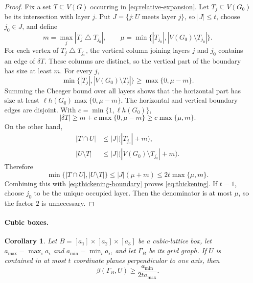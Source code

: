 \documentclass[aps,prx,reprint,superscriptaddress,nofootinbib,floatfix,longbibliography]{revtex4-2}
\newtheorem{corollary}[theorem]{Corollary}
\theoremstyle{definition}
\begin{document}
\begin{proof}
Fix a set $T\subseteq V(G)$ occurring in
\eqref{eq:relative-expansion}.  Let $T_j\subseteq V(G_0)$ be its
intersection with layer $j$.  Put
$J=\{j:U\text{ meets layer }j\}$, so $|J|\leq t$, choose $j_0\in J$, and
define
\begin{equation}
 m=\max_j|T_j\mathbin\triangle T_{j_0}|,
 \qquad
 \mu=\min\{|T_{j_0}|,|V(G_0)\setminus T_{j_0}|\}.
\end{equation}
For each vertex of $T_j\mathbin\triangle T_{j_0}$, the vertical column
joining layers $j$ and $j_0$ contains an edge of $\delta T$.  These columns
are distinct, so the vertical part of the boundary has size at least $m$.
For every $j$,
\begin{equation}
 \min\{|T_j|,|V(G_0)\setminus T_j|\}
 \geq \max\{0,\mu-m\}.
\end{equation}
Summing the Cheeger bound over all layers shows that the horizontal part
has size at least
$\ell h(G_0)\max\{0,\mu-m\}$.  The horizontal and vertical boundary edges
are disjoint.  With $c=\min\{1,\ell h(G_0)\}$,
\begin{equation}
 |\delta T|
 \geq m+c\max\{0,\mu-m\}
 \geq c\max\{\mu,m\}.
 \label{eq:thickening-boundary}
\end{equation}
On the other hand,
\begin{align}
 |T\cap U|&\leq |J|\bigl(|T_{j_0}|+m\bigr),\\
 |U\setminus T|&\leq |J|\bigl(|V(G_0)\setminus T_{j_0}|+m\bigr).
\end{align}
Therefore
\begin{equation}
 \min\{|T\cap U|,|U\setminus T|\}
 \leq |J|(\mu+m)
 \leq 2t\max\{\mu,m\}.
\end{equation}
Combining this with \eqref{eq:thickening-boundary} proves
\eqref{eq:thickening}.  If $t=1$, choose $j_0$ to be the unique
occupied layer.  Then the denominator is at most $\mu$, so the factor $2$
is unnecessary.
\end{proof}

\paragraph{Cubic boxes.}
\begin{corollary}
\label{cor:cubic-box-relative-expansion}
Let $B=[a_1]\times[a_2]\times[a_3]$ be a cubic-lattice box, let
$a_{\max}=\max_i a_i$ and $a_{\min}=\min_i a_i$, and let $\Gamma_B$ be its
grid graph.  If $U$ is contained in at most $t$ coordinate planes
perpendicular to one axis, then
\begin{equation}
 \beta(\Gamma_B,U)\geq \frac{a_{\min}}{2t a_{\max}}.
\end{equation}
\end{corollary}
\end{document}
